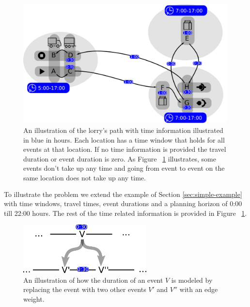 \


\begin{figure}[h]
  \centering
    \includegraphics[width=0.99\textwidth]{img/example_with_time_v2.pdf}
  \caption{An illustration of the lorry's path with time information illustrated in blue in hours. Each location has a time window that holds for all events at that location.
 If no time information is provided the travel duration or event duration is zero.
 As Figure ~\ref{fig:graph_time} illustrates, some events don't take up any time and going from event to event on the same location does not take up any time.
   }
  \label{fig:graph_time}
\end{figure}

To illustrate the problem we extend the example of Section \ref{sec:simple-example} with time windows, travel times, event durations and a planning horizon of 0:00 till 22:00 hours.
The rest of the time related information is provided in Figure ~\ref{fig:graph_time}. \\



\begin{figure}[h]
  \centering
    \includegraphics[width=0.6\textwidth]{img/pert.pdf}
  \caption{An illustration of how the duration of an event $V$ is modeled by replacing the event with two other events $V'$ and $V''$ with an edge weight.}
  \label{fig:duplication}
\end{figure}

